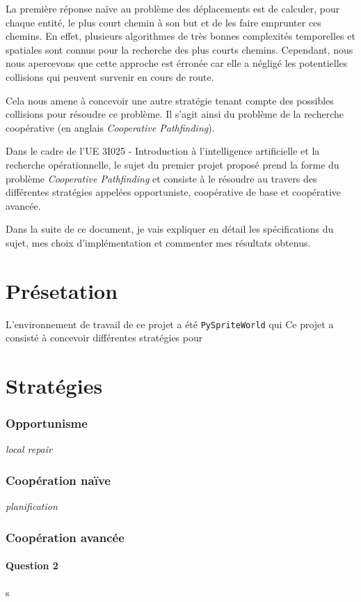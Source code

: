\documentclass[12pt,a4paper]{article}
\begin{document}
La premi\`ere r\'eponse na\"ive au probl\`eme des d\'eplacements est de calculer, pour chaque entit\'e, le plus court chemin \`a son but et de les faire emprunter ces chemins. En effet, plusieurs algorithmes de tr\`es bonnes complexit\'es temporelles et spatiales  sont connus pour la recherche des plus courts chemins. Cependant, nous nous apercevons que cette approche est \'erron\'ee car elle a n\'eglig\'e les potentielles collisions qui peuvent survenir en cours de route.

Cela nous amene \`a concevoir une autre strat\'egie tenant compte des possibles collisions pour r\'esoudre ce probl\`eme. Il s'agit ainsi du probl\`eme de la recherche coop\'erative (en anglais \textit{Cooperative Pathfinding}).

Dans le cadre de l'UE 3I025 - Introduction \`a l'intelligence artificielle et la recherche op\'erationnelle, le sujet du premier projet propos\'e prend la forme du probl\`eme \textit{Cooperative Pathfinding} et consiste \`a le r\'esoudre au travers des diff\'erentes strat\'egies appel\'ees opportuniste, coop\'erative de base et coop\'erative avanc\'ee.

Dans la suite de ce document, je vais expliquer en d\'etail les sp\'ecifications du sujet, mes choix d'impl\'ementation et commenter mes r\'esultats obtenus.

\newpage
\part{Pr\'esetation}


L'environnement de travail de ce projet a \'et\'e \texttt{PySpriteWorld} qui
Ce projet a consist\'e \`a concevoir diff\'erentes strat\'egies pour 

\part{Strat\'egies}

\section{Opportunisme}
\textit{local repair}

\section{Coop\'eration na\"ive}
\textit{planification}

\section{Coop\'eration avanc\'ee}


\subsection*{Question 2}
s

	
\printindex
\end{document}
